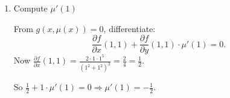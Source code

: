 \documentclass[12pt]{article}
\begin{document}
\begin{answerbox}
\begin{enumerate}
\begin{enumerate}
At $(1,1)$: $f(1,1) = \frac{1^2 \cdot 1^3}{1^2+1^2} = \frac{1}{2}$, so $g(1,1) = 0.
$$\frac{\partial g}{\partial y}(1,1) = \frac{\partial f}{\partial y}(1,1) = \frac{3\cdot1^4\cdot1^2 + 1^2\cdot1^4}{(1^2+1^2)^2} = \frac{3+1}{4} = 1 \neq 0$$
$
By implicit function theorem, $\exists U \ni 1$, $C^1$ function $\mu: U \to \mathbb{R}$ with $\mu(1)=1$ and $g(x,\mu(x))=0$ for $x\in U$.

    \item Compute $\mu'(1)$

From $g(x,\mu(x)) = 0$, differentiate:
\[
\frac{\partial f}{\partial x}(1,1) + \frac{\partial f}{\partial y}(1,1) \cdot \mu'(1) = 0.
\]
Now $\frac{\partial f}{\partial x}(1,1) = \frac{2\cdot1\cdot1^5}{(1^2+1^2)^2} = \frac{2}{4} = \frac{1}{2}$.

So $\frac{1}{2} + 1 \cdot \mu'(1) = 0 \Rightarrow \mu'(1) = -\frac{1}{2}$.
    \end{enumerate}
\end{enumerate}
\end{answerbox}

\end{document}
